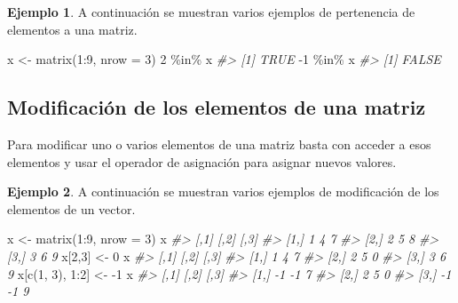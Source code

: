\documentclass[
]{book}
\newenvironment{Shaded}{\begin{snugshade}}{\end{snugshade}}
\newcommand{\AttributeTok}[1]{\textcolor[rgb]{0.77,0.63,0.00}{#1}}
\newcommand{\CommentTok}[1]{\textcolor[rgb]{0.56,0.35,0.01}{\textit{#1}}}
\newcommand{\DecValTok}[1]{\textcolor[rgb]{0.00,0.00,0.81}{#1}}
\newcommand{\FunctionTok}[1]{\textcolor[rgb]{0.00,0.00,0.00}{#1}}
\newcommand{\NormalTok}[1]{#1}
\newcommand{\OtherTok}[1]{\textcolor[rgb]{0.56,0.35,0.01}{#1}}
\newcommand{\SpecialCharTok}[1]{\textcolor[rgb]{0.00,0.00,0.00}{#1}}
\theoremstyle{definition}
\theoremstyle{definition}
\newtheorem{example}{Ejemplo}[chapter]
\theoremstyle{definition}
\theoremstyle{definition}
\theoremstyle{remark}
\begin{document}
\begin{example}

A continuación se muestran varios ejemplos de pertenencia de elementos a una matriz.

\begin{Shaded}
\begin{Highlighting}[]
\NormalTok{x }\OtherTok{\textless{}{-}} \FunctionTok{matrix}\NormalTok{(}\DecValTok{1}\SpecialCharTok{:}\DecValTok{9}\NormalTok{, }\AttributeTok{nrow =} \DecValTok{3}\NormalTok{)}
\DecValTok{2} \SpecialCharTok{\%in\%}\NormalTok{ x}
\CommentTok{\#\textgreater{} [1] TRUE}
\SpecialCharTok{{-}}\DecValTok{1} \SpecialCharTok{\%in\%}\NormalTok{ x}
\CommentTok{\#\textgreater{} [1] FALSE}
\end{Highlighting}
\end{Shaded}

\end{example}

\hypertarget{modificaciuxf3n-de-los-elementos-de-una-matriz}{%
\subsection{Modificación de los elementos de una matriz}\label{modificaciuxf3n-de-los-elementos-de-una-matriz}}

Para modificar uno o varios elementos de una matriz basta con acceder a esos elementos y usar el operador de asignación para asignar nuevos valores.

\begin{example}

A continuación se muestran varios ejemplos de modificación de los elementos de un vector.

\begin{Shaded}
\begin{Highlighting}[]
\NormalTok{x }\OtherTok{\textless{}{-}} \FunctionTok{matrix}\NormalTok{(}\DecValTok{1}\SpecialCharTok{:}\DecValTok{9}\NormalTok{, }\AttributeTok{nrow =} \DecValTok{3}\NormalTok{)}
\NormalTok{x}
\CommentTok{\#\textgreater{}      [,1] [,2] [,3]}
\CommentTok{\#\textgreater{} [1,]    1    4    7}
\CommentTok{\#\textgreater{} [2,]    2    5    8}
\CommentTok{\#\textgreater{} [3,]    3    6    9}
\NormalTok{x[}\DecValTok{2}\NormalTok{,}\DecValTok{3}\NormalTok{] }\OtherTok{\textless{}{-}} \DecValTok{0}
\NormalTok{x}
\CommentTok{\#\textgreater{}      [,1] [,2] [,3]}
\CommentTok{\#\textgreater{} [1,]    1    4    7}
\CommentTok{\#\textgreater{} [2,]    2    5    0}
\CommentTok{\#\textgreater{} [3,]    3    6    9}
\NormalTok{x[}\FunctionTok{c}\NormalTok{(}\DecValTok{1}\NormalTok{, }\DecValTok{3}\NormalTok{), }\DecValTok{1}\SpecialCharTok{:}\DecValTok{2}\NormalTok{] }\OtherTok{\textless{}{-}} \SpecialCharTok{{-}}\DecValTok{1}
\NormalTok{x}
\CommentTok{\#\textgreater{}      [,1] [,2] [,3]}
\CommentTok{\#\textgreater{} [1,]   {-}1   {-}1    7}
\CommentTok{\#\textgreater{} [2,]    2    5    0}
\CommentTok{\#\textgreater{} [3,]   {-}1   {-}1    9}
\end{Highlighting}
\end{Shaded}

\end{example}
\end{document}
